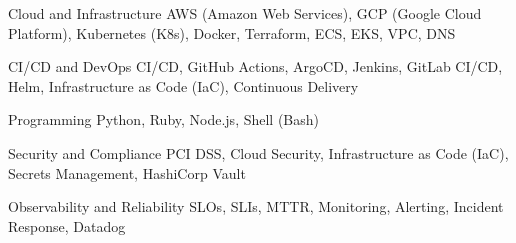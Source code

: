 \begin{cvskills}

\cvskill
    {Cloud and Infrastructure}
    {AWS (Amazon Web Services), GCP (Google Cloud Platform), Kubernetes (K8s), Docker, Terraform, ECS, EKS, VPC, DNS}

\cvskill
    {CI/CD and DevOps}
    {CI/CD, GitHub Actions, ArgoCD, Jenkins, GitLab CI/CD, Helm, Infrastructure as Code (IaC), Continuous Delivery}

\cvskill
    {Programming}
    {Python, Ruby, Node.js, Shell (Bash)}

\cvskill
    {Security and Compliance}
    {PCI DSS, Cloud Security, Infrastructure as Code (IaC), Secrets Management, HashiCorp Vault}

\cvskill
    {Observability and Reliability}
    {SLOs, SLIs, MTTR, Monitoring, Alerting, Incident Response, Datadog}

\end{cvskills}